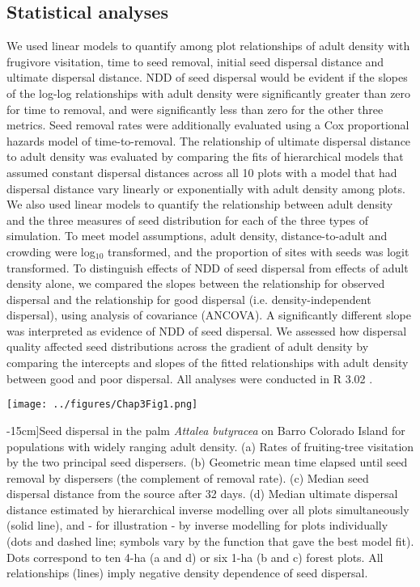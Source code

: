 \documentclass[b5paper,justified]{tufte-book} %
\begin{document}
\begin{fullwidth}
\subsection{Statistical analyses}
We used linear models to quantify among plot relationships of adult density with frugivore visitation, time to seed
removal, initial seed dispersal distance and ultimate dispersal distance. NDD of seed dispersal would be evident if the slopes of the log-log relationships with adult density were significantly greater than zero for time to removal, and were significantly less than zero for the other three metrics. Seed removal rates were additionally evaluated using a Cox proportional hazards model of time-to-removal. The relationship of ultimate dispersal distance to adult density was evaluated by comparing the fits of hierarchical models that assumed constant dispersal distances across all 10 plots with a model that had dispersal distance vary linearly or exponentially with adult density among plots.
We also used linear models to quantify the relationship between adult density and the three measures of seed distribution for each of the three types of simulation. To meet model assumptions, adult density, distance-to-adult and crowding were log$_{10}$ transformed, and the proportion of sites with seeds was logit transformed. To distinguish effects of NDD of seed dispersal from effects of adult density alone, we compared the slopes between the relationship for observed dispersal and the relationship for good dispersal (i.e. density-independent dispersal), using analysis of covariance (ANCOVA). A significantly different slope was interpreted as evidence of NDD of seed dispersal. We assessed how dispersal quality affected seed distributions across the gradient of adult density by comparing the intercepts and slopes of the fitted relationships with adult density between good and poor dispersal. All analyses
were conducted in R 3.02 \citep{RDCT2016}.

\begin{figure*}
\hspace*{2cm} \texttt{[image: ../figures/Chap3Fig1.png]}
\caption[Seed dispersal in the palm \textit{Attalea butyracea}][-15cm]{Seed dispersal in the palm \textit{Attalea butyracea} on Barro Colorado Island for populations with widely ranging adult density. (a) Rates of fruiting-tree visitation by the two principal seed dispersers. (b) Geometric mean time elapsed until seed removal by dispersers (the complement of removal rate). (c) Median seed dispersal distance from the source after 32 days. (d) Median ultimate dispersal distance estimated by hierarchical inverse modelling over all plots simultaneously (solid line), and - for illustration - by inverse modelling for plots individually (dots and dashed line; symbols vary by the function that gave the best model fit). Dots correspond to ten 4-ha (a and d) or six 1-ha (b and c) forest plots. All relationships (lines) imply negative density dependence of seed dispersal.
 }
\label{fig:chap3fig1}
\end{figure*}



\end{fullwidth}
\end{document}
